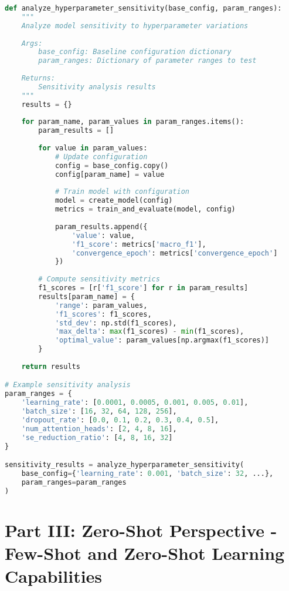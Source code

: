 \documentclass[journal]{IEEEtran}
\begin{document}
\begin{lstlisting}[language=Python, caption=Hyperparameter Sensitivity Analysis]
def analyze_hyperparameter_sensitivity(base_config, param_ranges):
    """
    Analyze model sensitivity to hyperparameter variations
    
    Args:
        base_config: Baseline configuration dictionary
        param_ranges: Dictionary of parameter ranges to test
    
    Returns:
        Sensitivity analysis results
    """
    results = {}
    
    for param_name, param_values in param_ranges.items():
        param_results = []
        
        for value in param_values:
            # Update configuration
            config = base_config.copy()
            config[param_name] = value
            
            # Train model with configuration
            model = create_model(config)
            metrics = train_and_evaluate(model, config)
            
            param_results.append({
                'value': value,
                'f1_score': metrics['macro_f1'],
                'convergence_epoch': metrics['convergence_epoch']
            })
        
        # Compute sensitivity metrics
        f1_scores = [r['f1_score'] for r in param_results]
        results[param_name] = {
            'range': param_values,
            'f1_scores': f1_scores,
            'std_dev': np.std(f1_scores),
            'max_delta': max(f1_scores) - min(f1_scores),
            'optimal_value': param_values[np.argmax(f1_scores)]
        }
    
    return results

# Example sensitivity analysis
param_ranges = {
    'learning_rate': [0.0001, 0.0005, 0.001, 0.005, 0.01],
    'batch_size': [16, 32, 64, 128, 256],
    'dropout_rate': [0.0, 0.1, 0.2, 0.3, 0.4, 0.5],
    'num_attention_heads': [2, 4, 8, 16],
    'se_reduction_ratio': [4, 8, 16, 32]
}

sensitivity_results = analyze_hyperparameter_sensitivity(
    base_config={'learning_rate': 0.001, 'batch_size': 32, ...},
    param_ranges=param_ranges
)
\end{lstlisting}

\section{Part III: Zero-Shot Perspective - Few-Shot and Zero-Shot Learning Capabilities}
\end{document}
